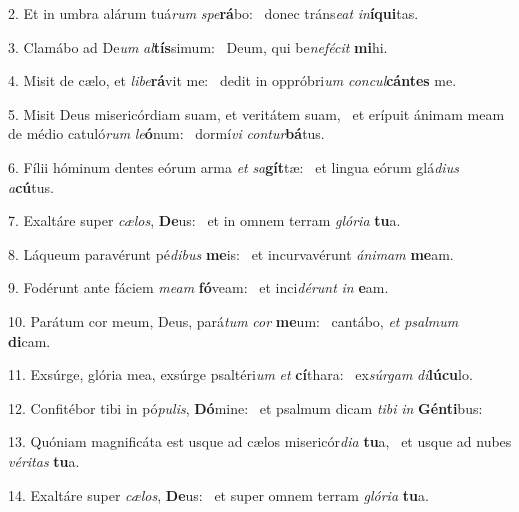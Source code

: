 2. Et in umbra alárum tuá\textit{rum} \textit{spe}\textbf{rá}bo: \ast\  donec tráns\textit{e}\textit{at} \textit{in}\textbf{í}\textbf{qui}tas.\

3. Clamábo ad De\textit{um} \textit{al}\textbf{tís}simum: \ast\  Deum, qui be\textit{ne}\textit{fé}\textit{cit} \textbf{mi}hi.\

4. Misit de cælo, et \textit{li}\textit{be}\textbf{rá}vit me: \ast\  dedit in oppróbri\textit{um} \textit{con}\textit{cul}\textbf{cán}\textbf{tes} me.\

5. Misit Deus misericórdiam suam, et veritátem suam, \dag\  et erípuit ánimam meam de médio catuló\textit{rum} \textit{le}\textbf{ó}num: \ast\  dormí\textit{vi} \textit{con}\textit{tur}\textbf{bá}tus.\

6. Fílii hóminum dentes eórum arma \textit{et} \textit{sa}\textbf{gít}tæ: \ast\  et lingua eórum glá\textit{di}\textit{us} \textit{a}\textbf{cú}tus.\

7. Exaltáre super \textit{cæ}\textit{los}, \textbf{De}us: \ast\  et in omnem terram \textit{gló}\textit{ri}\textit{a} \textbf{tu}a.\

8. Láqueum paravérunt pé\textit{di}\textit{bus} \textbf{me}is: \ast\  et incurvavérunt \textit{á}\textit{ni}\textit{mam} \textbf{me}am.\

9. Fodérunt ante fáciem \textit{me}\textit{am} \textbf{fó}veam: \ast\  et inci\textit{dé}\textit{runt} \textit{in} \textbf{e}am.\

10. Parátum cor meum, Deus, pará\textit{tum} \textit{cor} \textbf{me}um: \ast\  cantábo, \textit{et} \textit{psal}\textit{mum} \textbf{di}cam.\

11. Exsúrge, glória mea, exsúrge psaltéri\textit{um} \textit{et} \textbf{cí}thara: \ast\  ex\textit{súr}\textit{gam} \textit{di}\textbf{lú}\textbf{cu}lo.\

12. Confitébor tibi in pó\textit{pu}\textit{lis}, \textbf{Dó}mine: \ast\  et psalmum dicam \textit{ti}\textit{bi} \textit{in} \textbf{Gén}\textbf{ti}bus:\

13. Quóniam magnificáta est usque ad cælos misericór\textit{di}\textit{a} \textbf{tu}a, \ast\  et usque ad nubes \textit{vé}\textit{ri}\textit{tas} \textbf{tu}a.\

14. Exaltáre super \textit{cæ}\textit{los}, \textbf{De}us: \ast\  et super omnem terram \textit{gló}\textit{ri}\textit{a} \textbf{tu}a.\

